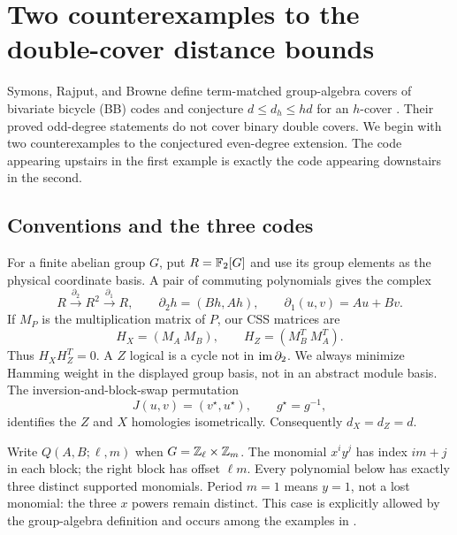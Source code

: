 \section{Two counterexamples to the double-cover distance bounds}
\label{sec:examples}
Symons, Rajput, and Browne define term-matched group-algebra covers of bivariate bicycle (BB) codes and conjecture $d\le d_h\le hd$ for an $h$-cover \cite[Theorem 3.1 and Section 4.3]{SRB}. Their proved odd-degree statements do not cover binary double covers. We begin with two counterexamples to the conjectured even-degree extension. The code appearing upstairs in the first example is exactly the code appearing downstairs in the second.

\subsection{Conventions and the three codes}
For a finite abelian group $G$, put $R=\mathbb F_2[G]$ and use its group elements as the physical coordinate basis. A pair of commuting polynomials gives the complex
\begin{equation}\label{eq:complex}
 R\xrightarrow{\partial_2}R^2\xrightarrow{\partial_1}R,
 \qquad \partial_2h=(Bh,Ah),\qquad \partial_1(u,v)=Au+Bv.
\end{equation}
If $M_P$ is the multiplication matrix of $P$, our CSS matrices are
\begin{equation}\label{eq:matrices}
 H_X=(M_A\ M_B),\qquad H_Z=(M_B^T\ M_A^T).
\end{equation}
Thus $H_XH_Z^T=0$. A $Z$ logical is a cycle not in $\operatorname{im}\partial_2$. We always minimize Hamming weight in the displayed group basis, not in an abstract module basis. The inversion-and-block-swap permutation
\begin{equation}\label{eq:J}
 J(u,v)=(v^\star,u^\star),\qquad g^\star=g^{-1},
\end{equation}
identifies the $Z$ and $X$ homologies isometrically. Consequently $d_X=d_Z=d$.

Write $Q(A,B;\ell,m)$ when $G=\mathbb Z_\ell\times\mathbb Z_m$. The monomial $x^iy^j$ has index $im+j$ in each block; the right block has offset $\ell m$. Every polynomial below has exactly three distinct supported monomials. Period $m=1$ means $y=1$, not a lost monomial: the three $x$ powers remain distinct. This case is explicitly allowed by the group-algebra definition and occurs among the examples in \cite[Remark 5 and Tables 2--4]{SRB}.

